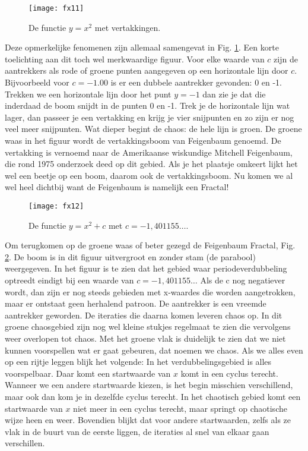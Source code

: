\documentclass[11pt,fleqn]{book} %
\begin{document}
\begin{figure}[h]
	\centering\texttt{[image: fx11]}
	\caption{De functie $y=x^2$ met vertakkingen.}
	\label{fig:fx11}
\end{figure}
Deze opmerkelijke fenomenen zijn allemaal samengevat in Fig. \ref{fig:fx11}. Een korte toelichting aan dit toch wel merkwaardige figuur. Voor elke waarde van $c$ zijn de aantrekkers als rode of groene punten aangegeven op een horizontale lijn door $c$. Bijvoorbeeld voor $c = -1.00$ is er een dubbele aantrekker gevonden: 0 en -1. Trekken we een horizontale lijn door het punt $y = -1$ dan zie je dat die inderdaad de boom snijdt in de punten 0 en -1. 
Trek je de horizontale lijn wat lager, dan passeer je een vertakking en krijg je vier snijpunten en zo zijn er nog veel meer snijpunten.
Wat dieper begint de chaos: de hele lijn is groen. 
De groene waas in het figuur wordt de vertakkingsboom van Feigenbaum genoemd. De vertakking is vernoemd naar de Amerikaanse wiskundige Mitchell Feigenbaum, die rond 1975 onderzoek deed op dit gebied. Als je het plaatsje omkeert lijkt het wel een beetje op een boom, daarom ook de vertakkingsboom. Nu komen we al wel heel dichtbij want de Feigenbaum is namelijk een Fractal!

\begin{figure}[h]
	\centering\texttt{[image: fx12]}
	\caption{De functie $y=x^2+c$ met $c=-1,401155\ldots$.}
	\label{fig:fx12}
\end{figure}
Om terugkomen op de groene waas of beter gezegd de Feigenbaum Fractal, Fig. \ref{fig:fx12}. De boom is in dit figuur uitvergroot en zonder stam (de parabool) weergegeven. In het figuur is te zien dat het gebied waar periodeverdubbeling optreedt eindigt bij een waarde van $c = -1,401155\ldots$ 
Als de c nog negatiever wordt, dan zijn er nog steeds gebieden met x-waardes die worden aangetrokken, maar er ontstaat geen herhalend patroon. De aantrekker is een vreemde aantrekker geworden. De iteraties die daarna komen leveren chaos op. In dit groene chaosgebied zijn nog wel kleine stukjes regelmaat te zien die vervolgens weer overlopen tot chaos. Met het groene vlak is duidelijk te zien dat we niet kunnen voorspellen wat er gaat gebeuren, dat noemen we chaos. 
Als we alles even op een rijtje leggen blijk het volgende: 
In het verdubbelingsgebied is alles voorspelbaar. Daar komt een startwaarde van $x$ komt in een cyclus terecht. Wanneer we een andere startwaarde kiezen, is het begin misschien  verschillend, maar ook dan kom je in dezelfde cyclus terecht. In het chaotisch gebied komt een startwaarde van $x$ niet meer in een cyclus terecht, maar springt op chaotische wijze heen en weer.
Bovendien blijkt dat voor andere startwaarden, zelfs als ze vlak in de buurt van de eerste liggen, de iteraties al snel van elkaar gaan verschillen.
\end{document}
